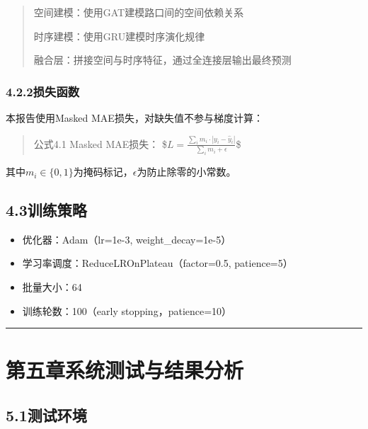 \documentclass{harryopo-report}
\begin{document}
\begin{quote}
{\fzht 空间建模}：使用GAT建模路口间的空间依赖关系

{\fzht 时序建模}：使用GRU建模时序演化规律

{\fzht 融合层}：拼接空间与时序特征，通过全连接层输出最终预测
\end{quote}

\subsection*{4.2.2损失函数}

本报告使用Masked MAE损失，对缺失值不参与梯度计算：

\begin{quote}
{\fzht 公式4.1} Masked MAE损失：
\$$L = \frac{\sum_{i} m_i \cdot |y_i - \hat{y}_i|}{\sum_{i} m_i + \epsilon}$\$
\end{quote}

其中$m_i \in \{0, 1\}$为掩码标记，$\epsilon$为防止除零的小常数。

\section*{4.3训练策略}

\begin{itemize}
  \item {\fzht 优化器}：Adam（lr=1e-3, weight\_decay=1e-5）
  \item {\fzht 学习率调度}：ReduceLROnPlateau（factor=0.5, patience=5）
  \item {\fzht 批量大小}：64
  \item {\fzht 训练轮数}：100（early stopping，patience=10）
\end{itemize}

\medskip\hrule\medskip

\chapter*{第五章系统测试与结果分析}

\section*{5.1测试环境}
\end{document}
